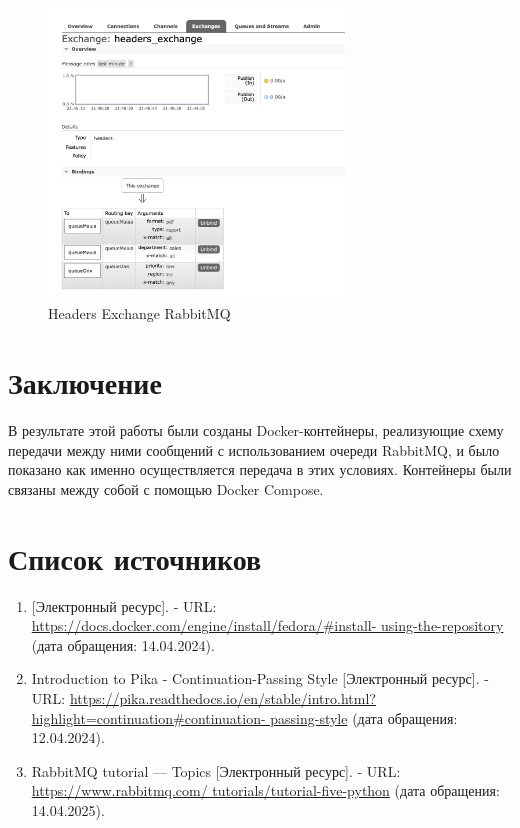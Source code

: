 \documentclass[areasetadvanced]{scrartcl}
\begin{document}
\begin{figure}[H]
	\centering
	\includegraphics[width=0.7\textwidth]{HeadersExchange.png}
	\caption{Headers Exchange RabbitMQ}
	\label{fig:syntdiag}
\end{figure}

\newpage
\section*{Заключение}
В результате этой работы были созданы Docker-контейнеры, реализующие схему передачи
между ними сообщений с использованием очереди RabbitMQ, и было показано как именно
осуществляется передача в этих условиях.
Контейнеры были связаны между собой с помощью Docker Compose.

\newpage
\section*{Список источников}
\begin{enumerate}
	\item {[Электронный ресурс]. - URL:
	\url{https://docs.docker.com/engine/install/fedora/#install-
	using-the-repository} (дата обращения: 14.04.2024).}
	\item Introduction to Pika - Continuation-Passing Style [Электронный ресурс]. - URL: \url{https://pika.readthedocs.io/en/stable/intro.html?highlight=continuation#continuation-
	passing-style} (дата обращения: 12.04.2024).
	\item RabbitMQ tutorial — Topics [Электронный ресурс]. - URL: \url{https://www.rabbitmq.com/
	tutorials/tutorial-five-python} (дата обращения: 14.04.2025).
\end{enumerate}
\end{document}
